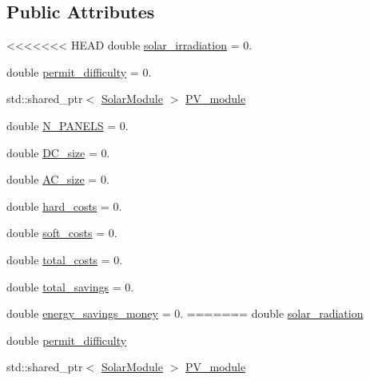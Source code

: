 \subsection*{Public Attributes}
\begin{DoxyCompactItemize}
\item 
<<<<<<< HEAD
double \hyperlink{classsolar__core_1_1_p_v_design_ae74d98b592c49c7bb44a2e2ec07093c4}{solar\+\_\+irradiation} = 0.
\item 
double \hyperlink{classsolar__core_1_1_p_v_design_a8c2897033c697a6dcfb96787358dc64f}{permit\+\_\+difficulty} = 0.
\item 
std\+::shared\+\_\+ptr$<$ \hyperlink{classsolar__core_1_1_solar_module}{Solar\+Module} $>$ \hyperlink{classsolar__core_1_1_p_v_design_a89f2b59847de64cab26b56f21ace4e6c}{P\+V\+\_\+module}
\item 
double \hyperlink{classsolar__core_1_1_p_v_design_abef277ad010afb4ab6c6c13113a8c017}{N\+\_\+\+P\+A\+N\+E\+L\+S} = 0.
\item 
double \hyperlink{classsolar__core_1_1_p_v_design_a21148518ef58004be10b91dc75fdd5b5}{D\+C\+\_\+size} = 0.
\item 
double \hyperlink{classsolar__core_1_1_p_v_design_a79a70e7fe3adcbc4e9256db9df38e444}{A\+C\+\_\+size} = 0.
\item 
double \hyperlink{classsolar__core_1_1_p_v_design_a18cec349cd8f04efcb67562e30416860}{hard\+\_\+costs} = 0.
\item 
double \hyperlink{classsolar__core_1_1_p_v_design_ac1220011d65d7cc442cd143f93123f31}{soft\+\_\+costs} = 0.
\item 
double \hyperlink{classsolar__core_1_1_p_v_design_ac015f1cf090279e45861f2860f008cc2}{total\+\_\+costs} = 0.
\item 
double \hyperlink{classsolar__core_1_1_p_v_design_a7628fe2e1ea95f8df79aca11dd5a356d}{total\+\_\+savings} = 0.
\item 
double \hyperlink{classsolar__core_1_1_p_v_design_a6b777b1d9dbd1f5a06b8d67d5204340b}{energy\+\_\+savings\+\_\+money} = 0.
=======
double \hyperlink{classsolar__core_1_1_p_v_design_a1a20c72743528802ed5498fe848559df}{solar\+\_\+radiation}
\item 
double \hyperlink{classsolar__core_1_1_p_v_design_a8c2897033c697a6dcfb96787358dc64f}{permit\+\_\+difficulty}
\item 
std\+::shared\+\_\+ptr$<$ \hyperlink{classsolar__core_1_1_solar_module}{Solar\+Module} $>$ \hyperlink{classsolar__core_1_1_p_v_design_a89f2b59847de64cab26b56f21ace4e6c}{P\+V\+\_\+module}

\end{DoxyCompactItemize}
